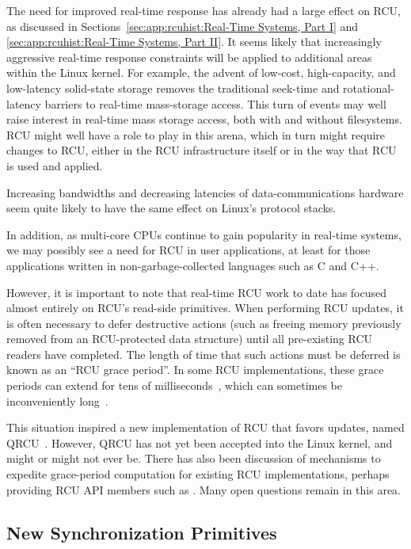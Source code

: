 The need for improved real-time response has already had a large
effect on RCU, as discussed in
Sections~\ref{sec:app:rcuhist:Real-Time Systems, Part I} and
\ref{sec:app:rcuhist:Real-Time Systems, Part II}.
It seems likely that increasingly aggressive real-time response constraints
will be applied to additional areas within the Linux kernel.
For example, the advent of low-cost, high-capacity, and low-latency
solid-state storage removes the traditional seek-time and rotational-latency
barriers to real-time mass-storage access.
This turn of events may well raise interest in real-time mass storage
access, both with and without filesystems.
RCU might well have a role to play in this arena, which in turn might
require changes to RCU, either in the RCU infrastructure itself
or in the way that RCU is used and applied.

Increasing bandwidths and decreasing latencies of data-communications
hardware seem quite likely to have the same effect on Linux's
protocol stacks.

In addition, as multi-core CPUs continue to gain popularity in real-time
systems, we may possibly see a need for RCU in user applications, at
least for those applications written in non-garbage-collected languages
such as C and C++.

However, it is important to note that real-time RCU work to date has
focused almost entirely on RCU's read-side primitives.
When performing RCU updates, it is often necessary to defer destructive
actions (such as freeing memory previously removed from an RCU-protected
data structure) until all pre-existing RCU readers have completed.
The length of time that such actions must be deferred is known as an
``RCU grace period''.
In some RCU implementations, these grace periods can extend for tens of
milliseconds~\cite{DinakarGuniguntala2008IBMSysJ}, which can sometimes
be inconveniently
long~\cite{JensAxboe2006SlowSRCU,PeterZijlstra2007SyncBarrier}.

This situation inspired a new implementation of RCU that favors updates,
named QRCU~\cite{PaulMcKenney2007QRCUpatch,
PaulEMcKenney2007QRCUspin,OlegNesterov2006QRCU}.
However, QRCU has not yet been accepted into the Linux kernel, and
might or might not ever be.
There has also been discussion of mechanisms to expedite grace-period
computation for existing RCU implementations, perhaps providing RCU API
members such as .
Many open questions remain in this area.

\subsection{New Synchronization Primitives}
\label{sec:app:rcuhist:New Synchronization Primitives}

